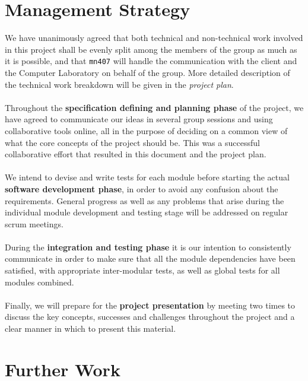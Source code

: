\documentclass[12p, a4paper, onecolumn]{report}
\begin{document}
\begin{appendices}
\chapter{Management Strategy}

We have unanimously agreed that both technical and non-technical work involved in this project shall be evenly split among the members of the group as much as it is possible, and that \texttt{mn407} will handle the communication with the client and the Computer Laboratory on behalf of the group. More detailed description of the technical work breakdown will be given in the \emph{project plan}. \\ \\
Throughout the \textbf{specification defining and planning phase} of the project, we have agreed to communicate our ideas in several group sessions and using collaborative tools online, all in the purpose of deciding on a common view of what the core concepts of the project should be. This was a successful collaborative effort that resulted in this document and the project plan. \\ \\
We intend to devise and write tests for each module before starting the actual \textbf{software development phase}, in order to avoid any confusion about the requirements. General progress as well as any problems that arise during the individual module development and testing stage will be addressed on regular scrum meetings. \\ \\
During the \textbf{integration and testing phase} it is our intention to consistently communicate in order to make sure that all the module dependencies have been satisfied, with appropriate inter-modular tests, as well as global tests for all modules combined. \\ \\
Finally, we will prepare for the \textbf{project presentation} by meeting two times to discuss the key concepts, successes and challenges throughout the project and a clear manner in which to present this material.

\chapter{Further Work}


\end{appendices}
\end{document}
